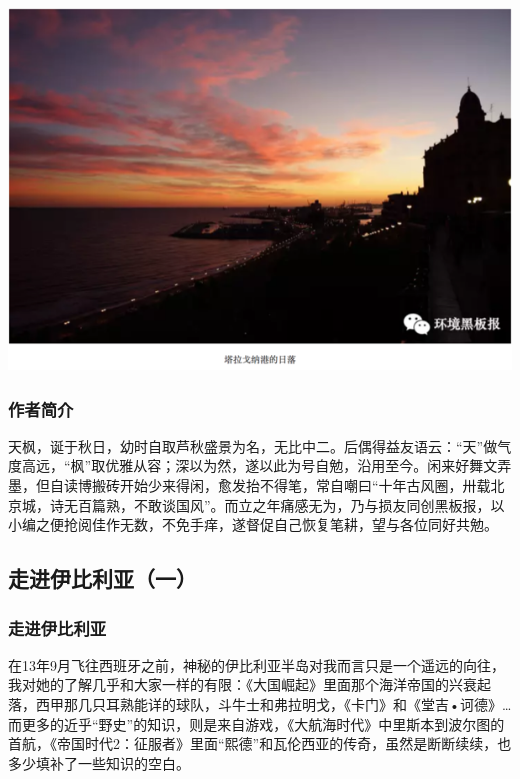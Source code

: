 \documentclass[
]{book}
\begin{document}
\includegraphics[width=8.33in]{images/xt7}

\hypertarget{ux4f5cux8005ux7b80ux4ecb-1}{%
\subsubsection{作者简介}\label{ux4f5cux8005ux7b80ux4ecb-1}}

天枫，诞于秋日，幼时自取芦秋盛景为名，无比中二。后偶得益友语云：``天''做气度高远，``枫''取优雅从容；深以为然，遂以此为号自勉，沿用至今。闲来好舞文弄墨，但自读博搬砖开始少来得闲，愈发抬不得笔，常自嘲曰``十年古风圈，卅载北京城，诗无百篇熟，不敢谈国风''。而立之年痛感无为，乃与损友同创黑板报，以小编之便抢阅佳作无数，不免手痒，遂督促自己恢复笔耕，望与各位同好共勉。

\hypertarget{ux8d70ux8fdbux4f0aux6bd4ux5229ux4e9aux4e00}{%
\subsection{走进伊比利亚（一）}\label{ux8d70ux8fdbux4f0aux6bd4ux5229ux4e9aux4e00}}

\hypertarget{ux8d70ux8fdbux4f0aux6bd4ux5229ux4e9a}{%
\subsubsection{走进伊比利亚}\label{ux8d70ux8fdbux4f0aux6bd4ux5229ux4e9a}}

在13年9月飞往西班牙之前，神秘的伊比利亚半岛对我而言只是一个遥远的向往，我对她的了解几乎和大家一样的有限：《大国崛起》里面那个海洋帝国的兴衰起落，西甲那几只耳熟能详的球队，斗牛士和弗拉明戈，《卡门》和《堂吉•诃德》\ldots 而更多的近乎``野史''的知识，则是来自游戏，《大航海时代》中里斯本到波尔图的首航，《帝国时代2：征服者》里面``熙德''和瓦伦西亚的传奇，虽然是断断续续，也多少填补了一些知识的空白。
\end{document}
